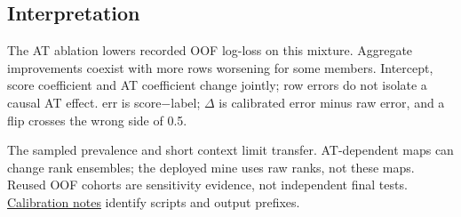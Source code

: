 \documentclass[10pt]{article}
\begin{document}
{\def\LTcaptype{none} %
\begin{center}
\end{center}
}

\subsection{Interpretation}\label{interpretation}

The AT ablation lowers recorded OOF log-loss on this mixture. Aggregate improvements coexist with more rows worsening for some members. Intercept, score coefficient and AT coefficient change jointly; row errors do not isolate a causal AT effect. err is \textbar score\ensuremath{-}label\textbar; \ensuremath{\Delta} is calibrated error minus raw error, and a flip crosses the wrong side of 0.5.

The sampled prevalence and short context limit transfer. AT-dependent maps can change rank ensembles; the deployed mine uses raw ranks, not these maps. Reused OOF cohorts are sensitivity evidence, not independent final tests. \href{../CALIBRATION_NOTES.md}{Calibration notes} identify scripts and output prefixes.
\end{document}
